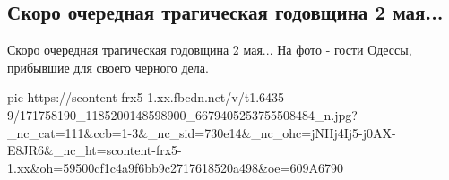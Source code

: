  
 
 
 
 
\subsection{Скоро очередная трагическая годовщина 2 мая...}
\label{sec:11_04_2021.fb.berdnik_miroslava.6.odessa_2_maja}

Скоро очередная трагическая годовщина 2 мая...
На фото - гости Одессы, прибывшие для своего черного дела.

\ifcmt
  pic https://scontent-frx5-1.xx.fbcdn.net/v/t1.6435-9/171758190_1185200148598900_6679405253755508484_n.jpg?_nc_cat=111&ccb=1-3&_nc_sid=730e14&_nc_ohc=jNHj4Ij5-j0AX-E8JR6&_nc_ht=scontent-frx5-1.xx&oh=59500cf1c4a9f6bb9c2717618520a498&oe=609A6790
\fi

